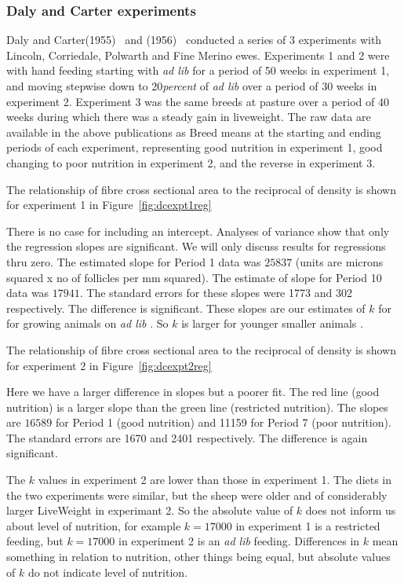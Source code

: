 \documentclass[titlepage]{article}  %
\begin{document}
\subsubsection{Daly and Carter experiments}
Daly and Carter(1955)~\cite{daly:55} and (1956)~\cite{daly:56} conducted a series of 3 experiments with Lincoln, Corriedale, Polwarth and Fine Merino ewes. Experiments 1 and 2 were with hand feeding starting with {\em ad lib} for a period of 50 weeks in experiment 1, and moving stepwise down to 20{\em percent} of {\em ad lib} over a period of 30 weeks in experiment 2. Experiment 3 was the same breeds at pasture over a period of 40 weeks during which there was a steady gain in liveweight. The raw data are available in the above publications as Breed means at the starting and ending periods of each experiment, representing good nutrition in experiment 1, good changing to poor nutrition in experiment 2, and the reverse in experiment 3.

The relationship of fibre cross sectional area to the reciprocal of density is shown for experiment 1 in Figure~\ref{fig:dcexpt1reg}

There is no case for including an intercept. Analyses of variance show that only the regression slopes are significant. We will only discuss results for regressions thru zero.  The estimated slope for Period 1 data was $25837$ (units are microns squared x no of follicles per mm squared). The estimate of slope for Period 10 data was $17941$. The standard errors for these slopes were 1773 and 302 respectively. The difference is significant. These slopes are our estimates of $k$ for for growing animals on {\em ad lib} . So $k$ is larger for younger smaller  animals . 

 The relationship of fibre cross sectional area to the reciprocal of density is shown for experiment 2 in Figure~\ref{fig:dcexpt2reg}

Here we have a larger difference in slopes but a poorer fit. The red line (good nutrition) is a larger slope than the green line (restricted nutrition). The slopes are $16589$ for Period 1 (good nutrition) and 11159 for Period 7 (poor nutrition). The standard errors are 1670 and 2401 respectively. The difference is again significant.

The $k$ values in experiment 2 are lower than those in experiment 1. The diets in the two experiments were similar, but the sheep were older and of considerably larger LiveWeight in experimant 2. So the absolute value of $k$ does not inform us about level of nutrition, for example $k=17000$ in experiment 1 is a restricted feeding, but $k=17000$ in experiment 2 is an {\em ad lib} feeding. Differences in $k$ mean something in relation to nutrition, other things being equal, but absolute values of $k$ do not indicate level of nutrition. 
\end{document}

